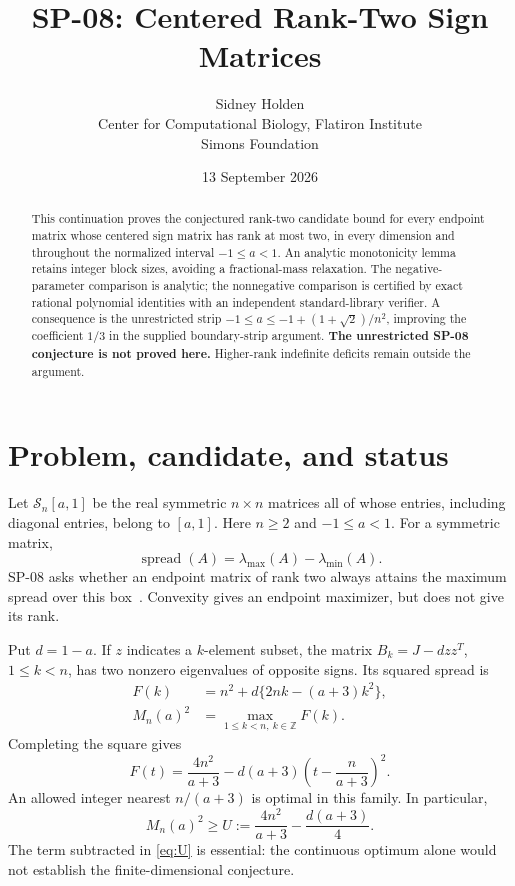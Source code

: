 \documentclass[11pt]{article}
\title{SP-08: Centered Rank-Two Sign Matrices}
\author{Sidney Holden\\{\small Center for Computational Biology, Flatiron Institute}\\{\small Simons Foundation}}
\date{13 September 2026}
\newcommand{\spn}{\operatorname{spread}}
\begin{document}
\maketitle
\begin{abstract}
This continuation proves the conjectured rank-two candidate bound for every
endpoint matrix whose centered sign matrix has rank at most two, in every
dimension and throughout the normalized interval $-1\le a<1$. An analytic
monotonicity lemma retains integer block sizes, avoiding a fractional-mass
relaxation. The negative-parameter comparison is analytic; the nonnegative
comparison is certified by exact rational polynomial identities with an
independent standard-library verifier. A consequence is the unrestricted strip
$-1\le a\le-1+(1+\sqrt2)/n^2$, improving the coefficient $1/3$ in the supplied
boundary-strip argument. \textbf{The unrestricted SP-08 conjecture is not
proved here.} Higher-rank indefinite deficits remain outside the argument.
\end{abstract}

\section{Problem, candidate, and status}
Let $\mathcal S_n[a,1]$ be the real symmetric $n\times n$ matrices all of whose
entries, including diagonal entries, belong to $[a,1]$. Here $n\ge2$ and
$-1\le a<1$. For a symmetric matrix,
\[
 \spn(A)=\lambda_{\max}(A)-\lambda_{\min}(A).
\]
SP-08 asks whether an endpoint matrix of rank two always attains the maximum
spread over this box~\cite{sp08}. Convexity gives an endpoint maximizer, but does
not give its rank.

Put $d=1-a$. If $z$ indicates a $k$-element subset, the matrix
$B_k=J-dzz^T$, $1\le k<n$, has two nonzero eigenvalues of opposite signs.
Its squared spread is
\begin{align}
 F(k)&=n^2+d\{2nk-(a+3)k^2\},\label{eq:F}\\
 M_n(a)^2&=\max_{1\le k<n,\ k\in\mathbb Z} F(k).
\end{align}
Completing the square gives
\begin{equation}\label{eq:round}
 F(t)=\frac{4n^2}{a+3}-d(a+3)\left(t-\frac{n}{a+3}\right)^2.
\end{equation}
An allowed integer nearest $n/(a+3)$ is optimal in this family. In particular,
\begin{equation}\label{eq:U}
 M_n(a)^2\ge U:=\frac{4n^2}{a+3}-\frac{d(a+3)}4.
\end{equation}
The term subtracted in \eqref{eq:U} is essential: the continuous optimum alone
would not establish the finite-dimensional conjecture.
\end{document}
